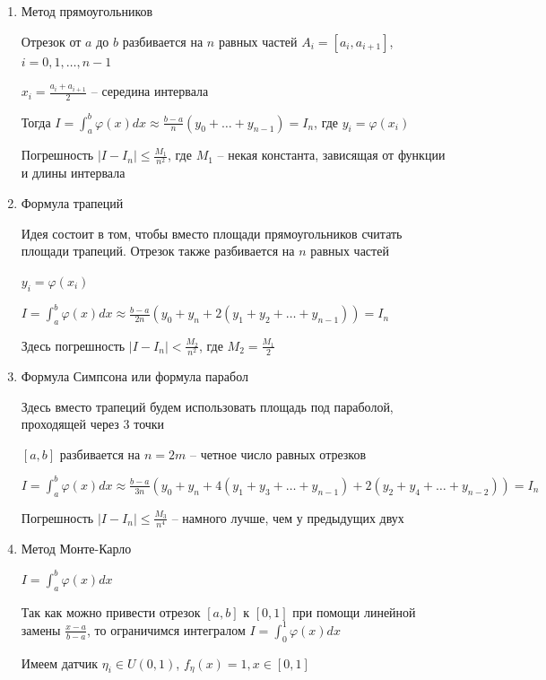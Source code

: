 \documentclass[12pt]{article}
\begin{document}
\begin{enumerate}[label*=\Roman*. ]
    \item Метод прямоугольников

    Отрезок от $a$ до $b$ разбивается на $n$ равных частей $A_i = [a_i, a_{i + 1}]$, $i = 0, 1, \dots, n - 1$

    $x_i = \frac{a_i + a_{i + 1}}{2}$ -- середина интервала

    Тогда $I = \int_a^b \varphi(x) dx \approx \frac{b - a}{n} (y_0 + \dots + y_{n - 1}) = I_n$, где $y_i = \varphi(x_i)$

    Погрешность $|I - I_n| \leq \frac{M_1}{n^2}$, где $M_1$ -- некая константа, зависящая от функции и длины интервала

    \item Формула трапеций

    Идея состоит в том, чтобы вместо площади прямоугольников считать площади трапеций. Отрезок также разбивается на $n$ равных частей

    $y_i = \varphi(x_i)$

    $I = \int_a^b \varphi(x) dx \approx \frac{b - a}{2n} (y_0 + y_n + 2(y_1 + y_2 + \dots + y_{n - 1})) = I_n$

    Здесь погрешность $|I - I_n| < \frac{M_2}{n^2}$, где $M_2 = \frac{M_1}{2}$

    \item Формула Симпсона или формула парабол

    Здесь вместо трапеций будем использовать площадь под параболой, проходящей через 3 точки

    $[a, b]$ разбивается на $n = 2m$ -- четное число равных отрезков

    $I = \int_a^b \varphi(x) dx \approx \frac{b - a}{3n} (y_0 + y_n + 4(y_1 + y_3 + \dots + y_{n - 1}) + 2(y_2 + y_4 + \dots + y_{n - 2})) = I_n$

    Погрешность $|I - I_n| \leq \frac{M_3}{n^4}$ -- намного лучше, чем у предыдущих двух

    \hypertarget{monte_carlo_integral}{}

    \item Метод Монте-Карло

    $I = \int_a^b \varphi(x) dx$

    Так как можно привести отрезок $[a, b]$ к $[0, 1]$ при помощи линейной замены $\frac{x - a}{b - a}$, то ограничимся интегралом $I = \int_0^1 \varphi(x) dx$

    Имеем датчик $\eta_i \in U(0, 1)$, $f_{\eta} (x) = 1, x \in [0, 1]$


\end{enumerate}
\end{document}
